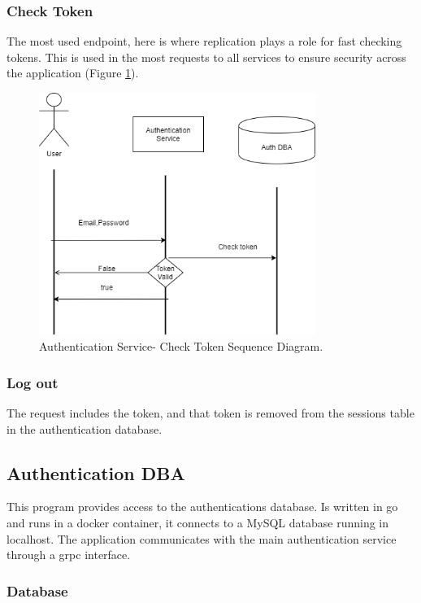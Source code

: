 \subsubsection{Check Token}

\indent
\indent
The most used endpoint, here is where replication plays a role for fast checking tokens. This is used in the most requests to all services to ensure security across the application (Figure \ref{auth:checktokensequence}).


\begin{figure}
\begin{center}
\includegraphics[width=90mm,scale=1]{img/auth/check-token-sequence.png}
\caption{Authentication Service- Check Token Sequence Diagram.}
\label{auth:checktokensequence}
\end{center}
\end{figure}

\subsubsection{Log out}
\indent
\indent
The request includes the token, and that token is removed from the sessions table in the authentication database.


\subsection{Authentication DBA}
\indent
\indent
This program provides access to the authentications database. Is written in go and runs in a docker container, it connects to a MySQL database running in localhost. The application communicates with the main authentication service through a grpc interface.

\subsubsection{Database}


